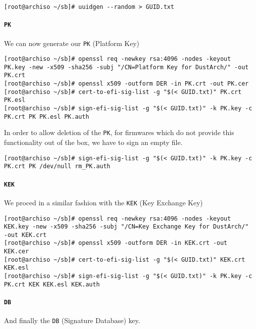 \documentclass[9pt]{report}
\begin{document}
\begin{verbatim}
[root@archiso ~/sb]# uuidgen --random > GUID.txt
\end{verbatim}


\vfill\eject

\hypertarget{x-pk}{\paragraph{\texttt{PK}}}
We can now generate our \texttt{PK} (Platform Key)


\begin{verbatim}
[root@archiso ~/sb]# openssl req -newkey rsa:4096 -nodes -keyout PK.key -new -x509 -sha256 -subj "/CN=Platform Key for DustArch/" -out PK.crt
[root@archiso ~/sb]# openssl x509 -outform DER -in PK.crt -out PK.cer
[root@archiso ~/sb]# cert-to-efi-sig-list -g "$(< GUID.txt)" PK.crt PK.esl
[root@archiso ~/sb]# sign-efi-sig-list -g "$(< GUID.txt)" -k PK.key -c PK.crt PK PK.esl PK.auth
\end{verbatim}

In order to allow deletion of the \texttt{PK}, for firmwares which do not provide this functionality out of the box, we have to sign an empty file.


\begin{verbatim}
[root@archiso ~/sb]# sign-efi-sig-list -g "$(< GUID.txt)" -k PK.key -c PK.crt PK /dev/null rm_PK.auth
\end{verbatim}


\vfill\eject

\hypertarget{x-kek}{\paragraph{\texttt{KEK}}}
We proced in a similar fashion with the \texttt{KEK} (Key Exchange Key)


\begin{verbatim}
[root@archiso ~/sb]# openssl req -newkey rsa:4096 -nodes -keyout KEK.key -new -x509 -sha256 -subj "/CN=Key Exchange Key for DustArch/" -out KEK.crt
[root@archiso ~/sb]# openssl x509 -outform DER -in KEK.crt -out KEK.cer
[root@archiso ~/sb]# cert-to-efi-sig-list -g "$(< GUID.txt)" KEK.crt KEK.esl
[root@archiso ~/sb]# sign-efi-sig-list -g "$(< GUID.txt)" -k PK.key -c PK.crt KEK KEK.esl KEK.auth
\end{verbatim}


\vfill\eject

\hypertarget{x-db}{\paragraph{\texttt{DB}}}
And finally the \texttt{DB} (Signature Database) key.
\end{document}
